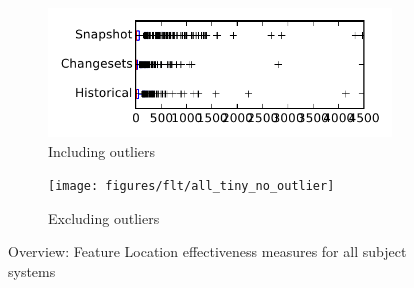 
\begin{figure}
    \centering
    \begin{subfigure}{.4\textwidth}
        \centering
        \includegraphics[height=0.4\textheight]{figures/flt/all_tiny}
        \caption{Including outliers}\label{fig:flt:all:tiny_outlier}
    \end{subfigure}%
    \begin{subfigure}{.4\textwidth}
        \centering
        \texttt{[image: figures/flt/all\_tiny\_no\_outlier]}
        \caption{Excluding outliers}\label{fig:flt:all:tiny_no_outlier}
    \end{subfigure}
\caption{Overview: Feature Location effectiveness measures for all subject systems}
\label{fig:flt:all:tiny}
\end{figure}

